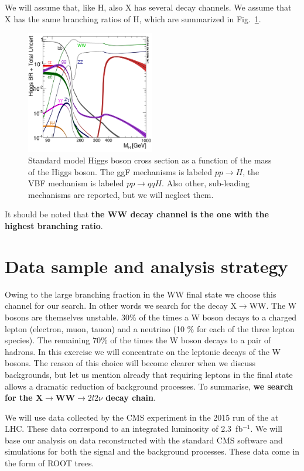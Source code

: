 \documentclass[a4paper,12pt]{article}
\begin{document}
 We will assume that, like H, also X has several decay channels. We assume
 that X has the same branching ratios of H, which are summarized in
 Fig.~\ref{fig:br}.  \begin{figure}
 \centering 
 \includegraphics[width=0.5\textwidth]{images/Higgs_BR.png}
 \caption{Standard model Higgs boson cross section as a function of the mass
 of the Higgs boson. The ggF mechanisms is labeled $pp\rightarrow{}H$, the VBF
 mechanism is labeled $pp\rightarrow{}qqH$. Also other, sub-leading mechanisms
 are reported, but we will neglect them.\label{fig:br}}
\end{figure}
It should be noted that {\bf the WW decay channel is the one with the highest
branching ratio}.

\section{Data sample and analysis strategy}
Owing to the large branching fraction in the WW final state we choose this
channel for our search. In other words we search for the decay
X$\rightarrow$WW. The W bosons are themselves unstable. 30\% of the times
 a W boson decays to a charged lepton (electron, muon, tauon) and a neutrino
 (10 \% for each of the three lepton species). The remaining 70\% of the times
 the W boson decays to a pair of hadrons. In this exercise we will concentrate on the leptonic decays of the W
bosons. The reason of this choice will become clearer when we discuss
backgrounds, but let us mention already that requiring leptons in the final
state allows a dramatic reduction of background processes. 
To summarise, {\bf we search for the X$\rightarrow$WW$\rightarrow{}2l2\nu$ decay
chain}.

We will use data collected by the CMS experiment in the 2015 run of the at LHC. These data correspond to an integrated luminosity of 2.3~fb$^{-1}$.
We will base our analysis on data reconstructed with the standard CMS software
and simulations for both the signal and the background processes. These data
come in the form of ROOT trees.
\end{document}
